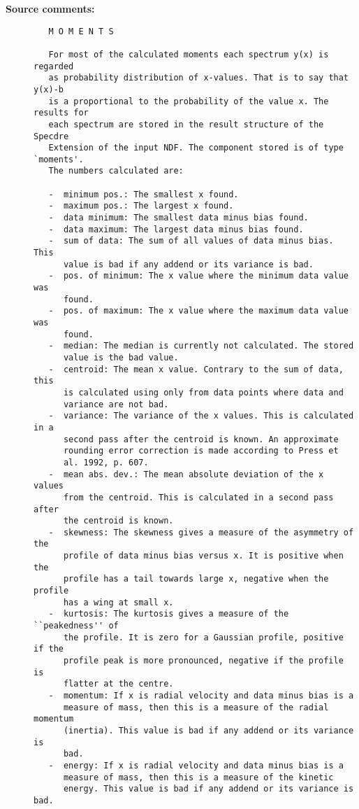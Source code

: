 \begin{description}
\begin{verbatim}
\end{verbatim}

\item [{\bf Source comments:}]
\begin{verbatim}
   M O M E N T S

   For most of the calculated moments each spectrum y(x) is regarded
   as probability distribution of x-values. That is to say that y(x)-b
   is a proportional to the probability of the value x. The results for
   each spectrum are stored in the result structure of the Specdre
   Extension of the input NDF. The component stored is of type `moments'.
   The numbers calculated are:

   -  minimum pos.: The smallest x found.
   -  maximum pos.: The largest x found.
   -  data minimum: The smallest data minus bias found.
   -  data maximum: The largest data minus bias found.
   -  sum of data: The sum of all values of data minus bias. This
      value is bad if any addend or its variance is bad.
   -  pos. of minimum: The x value where the minimum data value was
      found.
   -  pos. of maximum: The x value where the maximum data value was
      found.
   -  median: The median is currently not calculated. The stored
      value is the bad value.
   -  centroid: The mean x value. Contrary to the sum of data, this
      is calculated using only from data points where data and
      variance are not bad.
   -  variance: The variance of the x values. This is calculated in a
      second pass after the centroid is known. An approximate
      rounding error correction is made according to Press et
      al. 1992, p. 607.
   -  mean abs. dev.: The mean absolute deviation of the x values
      from the centroid. This is calculated in a second pass after
      the centroid is known.
   -  skewness: The skewness gives a measure of the asymmetry of the
      profile of data minus bias versus x. It is positive when the
      profile has a tail towards large x, negative when the profile
      has a wing at small x.
   -  kurtosis: The kurtosis gives a measure of the ``peakedness'' of
      the profile. It is zero for a Gaussian profile, positive if the
      profile peak is more pronounced, negative if the profile is
      flatter at the centre.
   -  momentum: If x is radial velocity and data minus bias is a
      measure of mass, then this is a measure of the radial momentum
      (inertia). This value is bad if any addend or its variance is
      bad.
   -  energy: If x is radial velocity and data minus bias is a
      measure of mass, then this is a measure of the kinetic
      energy. This value is bad if any addend or its variance is bad.


\end{verbatim}
\end{description}
